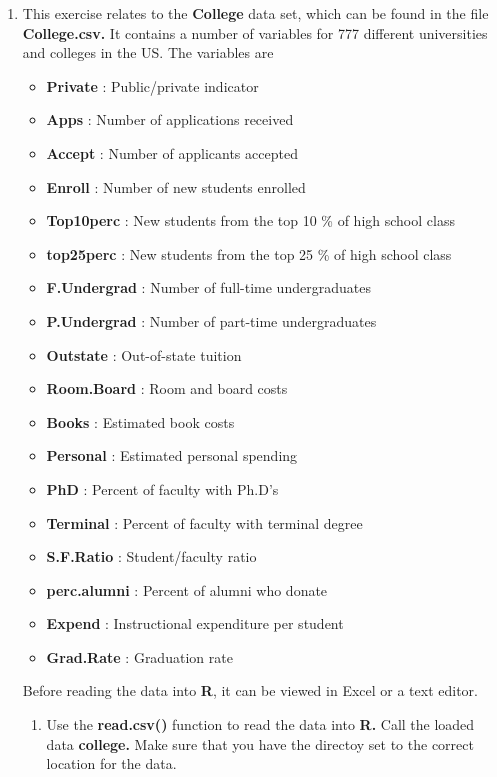 \documentclass[
]{article}
\author{}
\date{\vspace{-2.5em}}
\providecommand{\tightlist}{%
  \setlength{\itemsep}{0pt}\setlength{\parskip}{0pt}}
\begin{document}
\begin{enumerate}
\def\labelenumi{\arabic{enumi}.}
\setcounter{enumi}{7}
\tightlist
\item
  This exercise relates to the \textbf{College} data set, which can be
  found in the file \textbf{College.csv.} It contains a number of
  variables for 777 different universities and colleges in the US. The
  variables are

  \begin{itemize}
  \tightlist
  \item
    \textbf{Private} : Public/private indicator
  \item
    \textbf{Apps} : Number of applications received
  \item
    \textbf{Accept} : Number of applicants accepted
  \item
    \textbf{Enroll} : Number of new students enrolled
  \item
    \textbf{Top10perc} : New students from the top 10 \% of high school
    class
  \item
    \textbf{top25perc} : New students from the top 25 \% of high school
    class
  \item
    \textbf{F.Undergrad} : Number of full-time undergraduates
  \item
    \textbf{P.Undergrad} : Number of part-time undergraduates
  \item
    \textbf{Outstate} : Out-of-state tuition
  \item
    \textbf{Room.Board} : Room and board costs
  \item
    \textbf{Books} : Estimated book costs
  \item
    \textbf{Personal} : Estimated personal spending
  \item
    \textbf{PhD} : Percent of faculty with Ph.D's
  \item
    \textbf{Terminal} : Percent of faculty with terminal degree
  \item
    \textbf{S.F.Ratio} : Student/faculty ratio
  \item
    \textbf{perc.alumni} : Percent of alumni who donate
  \item
    \textbf{Expend} : Instructional expenditure per student
  \item
    \textbf{Grad.Rate} : Graduation rate
  \end{itemize}

  Before reading the data into \textbf{R}, it can be viewed in Excel or
  a text editor.

  \begin{enumerate}
  \def\labelenumii{\alph{enumii})}
  \tightlist
  \item
    Use the \textbf{read.csv()} function to read the data into
    \textbf{R.} Call the loaded data \textbf{college.} Make sure that
    you have the directoy set to the correct location for the data.
  \end{enumerate}
\end{enumerate}
\end{document}
